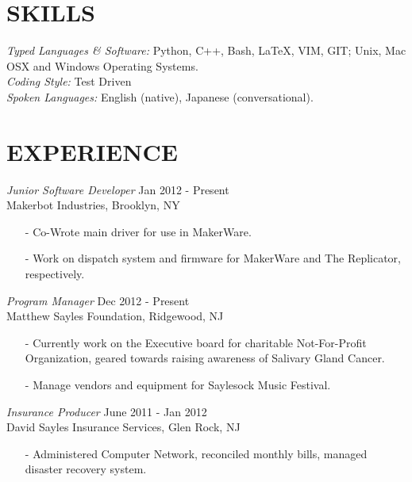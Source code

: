 \documentclass[margin, 10pt]{res} %
\begin{document}
\begin{resume}
\section{SKILLS} 

{\sl Typed Languages \& Software:}
Python, C++, Bash, \LaTeX, VIM, GIT; Unix, Mac OSX and Windows Operating Systems. \\
{\sl Coding Style:} Test Driven \\
{\sl Spoken Languages:}
English (native), Japanese (conversational). \\

 
\section{EXPERIENCE}

{\sl Junior Software Developer} \hfill Jan 2012 - Present \\
Makerbot Industries, Brooklyn, NY
\begin{itemize} \itemsep -2pt
\item[-] Co-Wrote main driver for use in MakerWare.
\item[-] Work on dispatch system and firmware for MakerWare and The Replicator, respectively.
\end{itemize}

{\sl Program Manager} \hfill Dec 2012 - Present \\
Matthew Sayles Foundation, Ridgewood, NJ
\begin{itemize} \itemsep -2pt
\item[-] Currently work on the Executive board for charitable Not-For-Profit Organization, geared towards raising awareness of Salivary Gland Cancer.
\item[-] Manage vendors and equipment for Saylesock Music Festival.
\end{itemize}

{\sl Insurance Producer} \hfill June 2011 - Jan 2012 \\
David Sayles Insurance Services, Glen Rock, NJ
\begin{itemize} \itemsep -2pt
\item[-] Administered Computer Network, reconciled monthly bills, managed disaster recovery system.
\end{itemize}


\end{resume}
\end{document}
